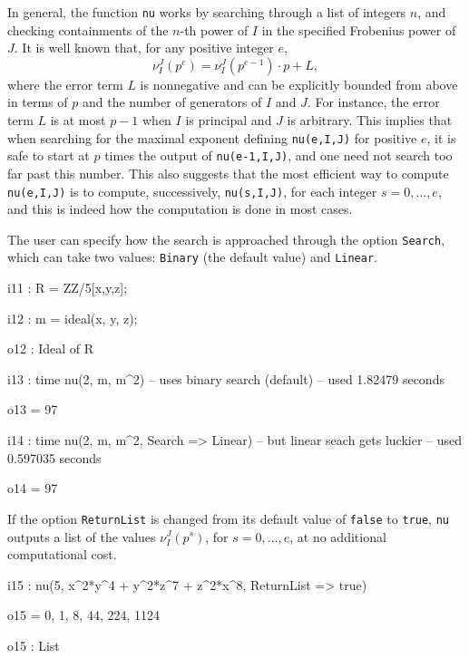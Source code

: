 \documentclass{amsart}
\begin{document}
In general, the function \texttt{nu} works by searching through a list of integers $n$, and checking containments of the $n$-th power of $I$ in the specified Frobenius power of $J$.
It is well known that, for any positive integer $e$,
\[ \nu_I^J(p^e) = \nu_I^J(p^{e-1})\cdot p + L,\]
where the error term $L$ is nonnegative and can be explicitly bounded from above in terms of $p$ and the number of generators of $I$ and $J$.
For instance, the error term $L$ is at most $p-1$ when $I$ is principal and $J$ is arbitrary.
This implies that when searching for the maximal exponent defining \texttt{nu(e,I,J)} for positive $e$, it is safe to start at $p$ times the output of \texttt{nu(e-1,I,J)}, and one need not search too far past this number.
This also suggests that the most efficient way to compute \texttt{nu(e,I,J)} is to compute, successively, \texttt{nu(s,I,J)}, for each integer $s = 0,\ldots,e$, and this is indeed how the computation is done in most cases.

The user can specify how the search is approached through the option \texttt{Search}, which can take two values: 
 \texttt{Binary} (the default value) and \texttt{Linear}.

\smallskip
{\small
{}
\begin{MyVerbatim}
i11 : R = ZZ/5[x,y,z];

i12 : m = ideal(x, y, z);

o12 : Ideal of R

i13 : time nu(2, m, m^2) -- uses binary search (default)
     -- used 1.82479 seconds

o13 = 97

i14 : time nu(2, m, m^2, Search => Linear) -- but linear seach gets luckier
     -- used 0.597035 seconds

o14 = 97
\end{MyVerbatim}
}
\smallskip

If the option \texttt{ReturnList} is changed from its default value of \texttt{false} to \texttt{true}, \texttt{nu} outputs a list of the values $\nu_I^J(p^s)$, for $s=0,\ldots,e$, at no additional computational cost.

\smallskip
{\small
{}
\begin{MyVerbatim}
i15 : nu(5, x^2*y^4 + y^2*z^7 + z^2*x^8, ReturnList => true)

o15 = {0, 1, 8, 44, 224, 1124}

o15 : List
\end{MyVerbatim}
}
\smallskip
\end{document}
